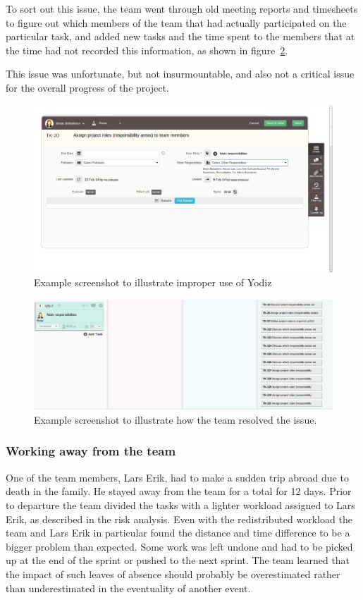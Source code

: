 To sort out this issue, the team went through old meeting reports and timesheets
to figure out which members of the team that had actually participated on the
particular task, and added new tasks and the time spent to the members that at
the time had not recorded this information, as shown in
figure~\ref{fig:addsTasks}.

This issue was unfortunate, but not insurmountable, and also not a critical
issue for the overall progress of the project.

\begin{figure}[H]
\includegraphics[width=\textwidth]{ch/sprints/fig/wrongUse.png}
\caption{Example screenshot to illustrate improper use of Yodiz}
\label{fig:wrongUse}
\end{figure}

\begin{figure}[H]
\includegraphics[width=\textwidth]{ch/sprints/fig/addsTasks.png}
\caption{Example screenshot to illustrate how the team resolved the issue.}
\label{fig:addsTasks}
\end{figure}

\subsubsection{Working away from the team}
One of the team members, Lars Erik, had to make a sudden trip abroad due to
death in the family. He stayed away from the team for a total for 12 days. Prior
to departure the team divided the tasks with a lighter workload assigned to Lars
Erik, as described in the risk analysis. Even with the redistributed workload
the team and Lars Erik in particular found the distance and time difference to
be a bigger problem than expected. Some work was left undone and had to be
picked up at the end of the sprint or pushed to the next sprint. The team
learned that the impact of such leaves of absence should probably be
overestimated rather than underestimated in the eventuality of another event.

